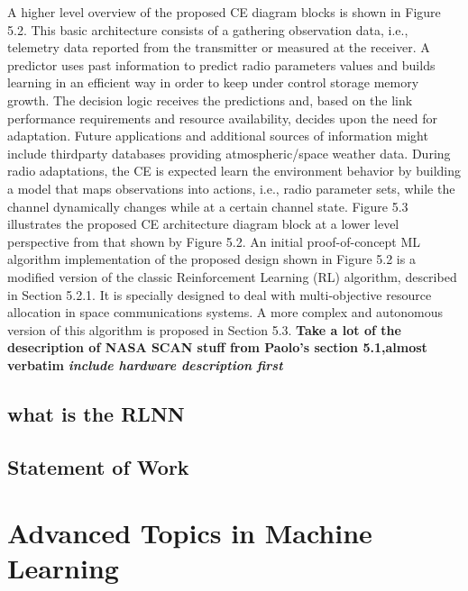 \documentclass[11pt]{report}
\begin{document}
	\par A higher level overview of the proposed CE diagram blocks is shown in Figure 5.2. This basic architecture consists of a gathering observation data, i.e., telemetry data reported
	from the transmitter or measured at the receiver. A predictor uses past information to predict radio parameters values and builds learning in an efficient way in order to keep under control storage memory growth. The decision logic receives the predictions and, based
	on the link performance requirements and resource availability, decides upon the need for adaptation. Future applications and additional sources of information might include thirdparty databases providing atmospheric/space weather data. During radio adaptations, the CE is expected learn the environment behavior by building a model that maps observations into actions, i.e., radio parameter sets, while the channel
	dynamically changes while at a certain channel state. Figure 5.3 illustrates the proposed CE architecture diagram block at a lower level perspective from that shown by Figure 5.2. An initial proof-of-concept ML algorithm implementation of the proposed design shown in Figure 5.2 is a modified version of the classic Reinforcement Learning (RL) algorithm, described in Section 5.2.1. It is specially designed to deal with multi-objective resource allocation in space communications systems. A more complex and autonomous version of this algorithm is proposed in Section 5.3.
	\textbf{Take a lot of the desecription of NASA SCAN stuff from Paolo's section 5.1,almost verbatim}
	\textbf{\textit{include hardware description first}}
	\subsection{ what is the RLNN}
	\subsection{Statement of Work}
	
	\section{Advanced Topics in Machine Learning}
\end{document}
